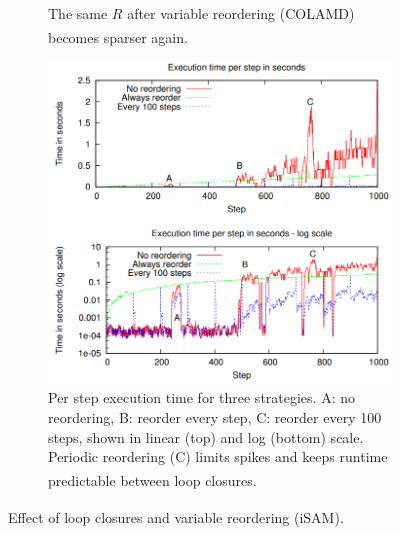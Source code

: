 \begin{figure}[H]
\begin{minipage}[t]{0.48\linewidth}
\begin{subfigure}[t]{0.49\linewidth}
            \caption{The same $R$ after variable reordering (COLAMD) becomes sparser again.\textsuperscript{\cite{iSAM_paper}}}\label{fig:l-bot-right}
        \end{subfigure}
    \end{minipage}\hfill
    \begin{minipage}[t]{0.49\linewidth}
        \vspace{0pt}
        \begin{subfigure}[t]{\linewidth}
            \centering
            \includegraphics[width=\linewidth,height=0.98\textheight,keepaspectratio]{Pictures/Optimizers/iSAM/Variable_Reordering4.png}
            \caption{Per step execution time for three strategies. A: no reordering, B: reorder every step, C: reorder every 100 steps, shown in linear (top) and log (bottom) scale. Periodic reordering (C) limits spikes and keeps runtime predictable between loop closures.\textsuperscript{\cite{iSAM_paper}}}\label{fig:r-full}
        \end{subfigure}
    \end{minipage}

    \caption{Effect of loop closures and variable reordering (iSAM).\textsuperscript{\cite{iSAM_paper}}}
    \label{fig:variable-reordering}
\end{figure}
\noindent
